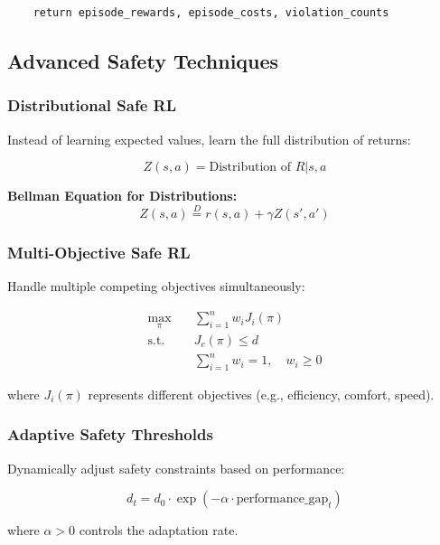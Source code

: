 \documentclass[12pt]{article}
\begin{document}
{{{{\begin{verbatim}
    return episode_rewards, episode_costs, violation_counts
\end{verbatim}

\subsection{Advanced Safety Techniques}

\subsubsection{Distributional Safe RL}

Instead of learning expected values, learn the full distribution of returns:

\begin{equation}
Z(s,a) = \text{Distribution of } R|s,a
\end{equation}

\textbf{Bellman Equation for Distributions:}
\begin{equation}
Z(s,a) \overset{D}{=} r(s,a) + \gamma Z(s', a')
\end{equation}

\subsubsection{Multi-Objective Safe RL}

Handle multiple competing objectives simultaneously:

\begin{align}
\max_{\pi} \quad & \sum_{i=1}^{n} w_i J_i(\pi) \\
\text{s.t.} \quad & J_c(\pi) \leq d \\
& \sum_{i=1}^{n} w_i = 1, \quad w_i \geq 0
\end{align}

where $J_i(\pi)$ represents different objectives (e.g., efficiency, comfort, speed).

\subsubsection{Adaptive Safety Thresholds}

Dynamically adjust safety constraints based on performance:

\begin{equation}
d_t = d_0 \cdot \exp(-\alpha \cdot \text{performance\_gap}_t)
\end{equation}

where $\alpha > 0$ controls the adaptation rate.

}}}}
\end{document}
